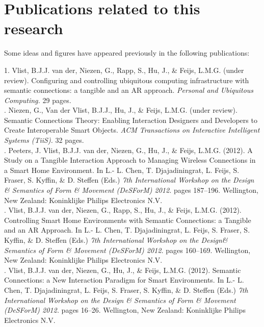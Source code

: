 \cleardoublepage
\pagestyle{empty}

\chapter*{Publications related to this research}

Some ideas and figures have appeared previously in the following publications:

\bigskip

1. Vlist, B.J.J. van der, Niezen, G., Rapp, S., Hu, J., \& Feijs, L.M.G.  (under review). Configuring and controlling ubiquitous computing infrastructure with semantic connections: a tangible and an AR approach. \emph{Personal and Ubiquitous Computing.} 29 pages. \\

. Niezen, G., Van der Vlist, B.J.J., Hu, J., \& Feijs, L.M.G.  (under review). Semantic Connections Theory: Enabling Interaction Designers and Developers to Create Interoperable Smart Objects. \emph{ACM Transactions on Interactive Intelligent Systems (TiiS).} 32 pages. \\

. Peeters, J. Vlist, B.J.J. van der, Niezen, G., Hu, J., \& Feijs, L.M.G. (2012). A Study on a Tangible Interaction Approach to Managing Wireless Connections in a Smart Home Environment.  In L.- L. Chen, T. Djajadiningrat, L. Feijs, S. Fraser, S. Kyffin, \&  D. Steffen (Eds.) \emph{7th International Workshop on the Design \& Semantics of Form \& Movement (DeSForM) 2012.} pages 187--196. Wellington, New Zealand: Koninklijke Philips Electronics N.V.\\

. Vlist, B.J.J. van der, Niezen, G., Rapp, S., Hu, J., \& Feijs, L.M.G. (2012). Controlling Smart Home Environments with Semantic Connections: a Tangible and an AR Approach. In L.- L. Chen, T. Djajadiningrat, L. Feijs, S. Fraser, S. Kyffin, \&  D. Steffen (Eds.) \emph{7th International Workshop on the Design\& Semantics of Form \& Movement (DeSForM) 2012.} pages 160--169.  Wellington, New Zealand: Koninklijke Philips Electronics N.V.\\

. Vlist, B.J.J. van der, Niezen, G., Hu, J., \& Feijs, L.M.G. (2012). Semantic Connections: a New Interaction Paradigm for Smart Environments. In L.- L. Chen, T. Djajadiningrat, L. Feijs, S. Fraser, S. Kyffin, \&  D. Steffen (Eds.) \emph{7th International Workshop on the Design \& Semantics of Form \& Movement (DeSForM) 2012.} pages 16--26. Wellington, New Zealand: Koninklijke Philips Electronics N.V.\\

